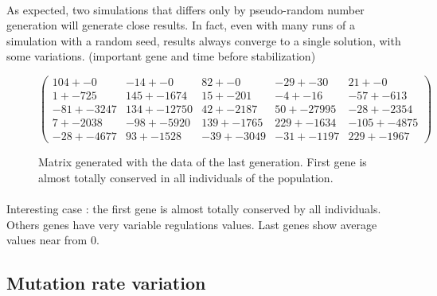 \documentclass[]{report} %
\begin{document}
    \paragraph*{}
    As expected, two simulations that differs only by pseudo-random number generation will generate close results. 
    In fact, even with many runs of a simulation with a random seed, results always converge to a single solution, with some variations.
    (important gene and time before stabilization)

    \begin{figure}[H] 
            \centering
            \small
    $
            \begin{pmatrix}
                104 +- 0 & -14 +- 0 & 82 +- 0 & -29 +- 30 & 21 +- 0 \\
                1 +- 725 & 145 +- 1674 & 15 +- 201 & -4 +- 16 & -57 +- 613 \\
                -81 +- 3247 & 134 +- 12750 & 42 +- 2187 & 50 +- 27995 & -28 +- 2354 \\
                7 +- 2038 & -98 +- 5920 & 139 +- 1765 & 229 +- 1634 & -105 +- 4875 \\
                -28 +- 4677 & 93 +- 1528 & -39 +- 3049 & -31 +- 1197 & 229 +- 1967 
            \end{pmatrix}
    $
            \caption{\footnotesize Matrix generated with the data of the last generation. First gene is almost totally conserved in all individuals of the population.}
            \label{mat:telltaleAlt}
    \end{figure}
    \paragraph*{}
    Interesting case : the first gene is almost totally conserved by all individuals. Others genes have very variable regulations values.
    Last genes show average values near from 0.
    


    \newpage
\subsection{Mutation rate variation}
\end{document}

